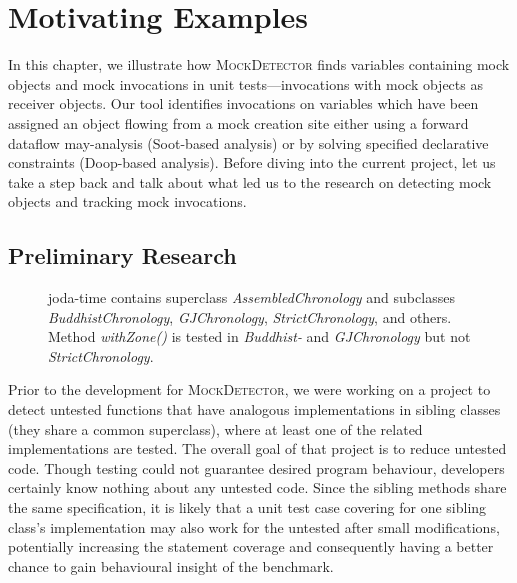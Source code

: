 \chapter{Motivating Examples}
\label{chap:motivating-example}

In this chapter, we illustrate how \textsc{MockDetector} finds variables containing mock objects and mock invocations in unit tests---invocations with mock objects as receiver objects. Our tool identifies invocations on variables which have been assigned an object flowing from a mock creation site either using a forward dataflow may-analysis (Soot-based analysis) or by solving specified declarative constraints (Doop-based analysis). Before diving into the current project, let us take a step back and talk about what led us to the research on detecting mock objects and tracking mock invocations.

\section{Preliminary Research}

\begin{figure}[h]
	\centering
	
	\caption[Caption for SiblingClass untested method.]{joda-time contains superclass \textit{AssembledChronology} and subclasses \textit{BuddhistChronology}, \textit{GJChronology}, \textit{StrictChronology}, and others. Method \textit{withZone()} is tested in \textit{Buddhist-} and \textit{GJChronology} but not \textit{StrictChronology}.\footnotemark}
	\label{fig:hierarchyView}
\end{figure}

\setcounter{footnote}{1}

Prior to the development for \textsc{MockDetector}, we were working on a project to detect untested functions that have analogous implementations in sibling classes (they share a common superclass), where at least one of the related implementations are tested. The overall goal of that project is to reduce untested code. Though testing could not guarantee desired program behaviour, developers certainly know nothing about any untested code. Since the sibling methods share the same specification, it is likely that a unit test case covering for one sibling class's implementation may also work for the untested after small modifications, potentially increasing the statement coverage and consequently having a better chance to gain behavioural insight of the benchmark.

